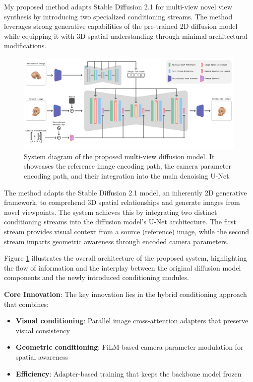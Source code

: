 My proposed method adapts Stable Diffusion 2.1 for multi-view novel view synthesis by introducing two specialized conditioning streams. The method leverages strong generative capabilities of the pre-trained 2D diffusion model while equipping it with 3D spatial understanding through minimal architectural modifications.

\begin{figure}[htbp]
  \centering
  \includegraphics[width=\textwidth]{images/proposed-method/my-method-diagram.png}
  \caption{System diagram of the proposed multi-view diffusion model. It showcases the reference image encoding path, the camera parameter encoding path, and their integration into the main denoising U-Net.}
  \label{fig:my-method-diagram}
\end{figure}

The method adapts the Stable Diffusion 2.1 model, an inherently 2D generative framework, to comprehend 3D spatial relationships and generate images from novel viewpoints. The system achieves this by integrating two distinct conditioning streams into the diffusion model's U-Net architecture. The first stream provides visual context from a source (reference) image, while the second stream imparts geometric awareness through encoded camera parameters.

Figure \ref{fig:my-method-diagram} illustrates the overall architecture of the proposed system, highlighting the flow of information and the interplay between the original diffusion model components and the newly introduced conditioning modules.

\textbf{Core Innovation}: The key innovation lies in the hybrid conditioning approach that combines:
\begin{itemize}
  \item \textbf{Visual conditioning}: Parallel image cross-attention adapters that preserve visual consistency
  \item \textbf{Geometric conditioning}: FiLM-based camera parameter modulation for spatial awareness
  \item \textbf{Efficiency}: Adapter-based training that keeps the backbone model frozen
\end{itemize}

